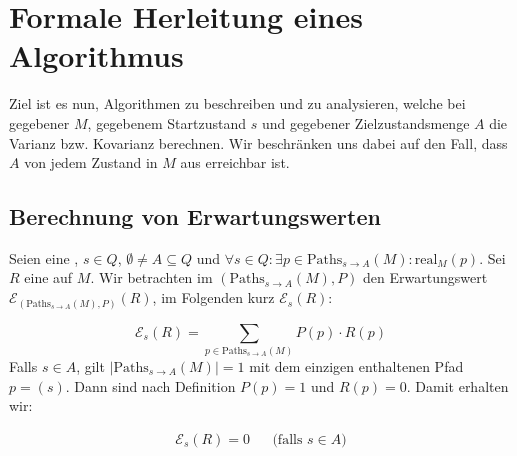 \documentclass[a4paper]{article}
\theoremstyle{nonumberplain}
\begin{document}
{\section{Formale Herleitung eines Algorithmus}

Ziel ist es nun, Algorithmen zu beschreiben und zu analysieren, welche bei gegebener \mc{} $M$, gegebenem Startzustand $s$ und gegebener Zielzustandsmenge $A$ die Varianz bzw. Kovarianz berechnen. Wir beschränken uns dabei auf den Fall, dass $A$ von jedem Zustand in $M$ aus erreichbar ist.

\subsection{Berechnung von Erwartungswerten}

Seien \mcex{} eine \mc{}, $s \in Q$, $\emptyset \neq A \subseteq Q$ und $\forall s \in Q: \exists p \in \mathrm{Paths}_{s \rightarrow A}(M) : \mathrm{real}_{M}(p)$. Sei $R$ eine  \reward{} auf $M$. Wir betrachten im \probspace{} $(\mathrm{Paths}_{s \rightarrow A}(M), P)$ den Erwartungswert $\mathcal{E}_{(\mathrm{Paths}_{s \rightarrow A}(M), P)}(R)$, im Folgenden kurz $\mathcal{E}_{s}(R)$:

\begin{equation}
	\mathcal{E}_{s}(R) = \sum_{p \in \mathrm{Paths}_{s \rightarrow A}(M)}{P(p) \cdot R(p)} 
\end{equation}
Falls $s \in A$, gilt $|\mathrm{Paths}_{s \rightarrow A}(M)| = 1$ mit dem einzigen enthaltenen Pfad $p = (s)$. Dann sind nach Definition $P(p) = 1$ und $R(p) = 0$. Damit erhalten wir:

\begin{align}
	\mathcal{E}_{s}(R) = 0 && \text{(falls $s \in A$)}\label{expect_trivial}
\end{align}

}
\end{document}
